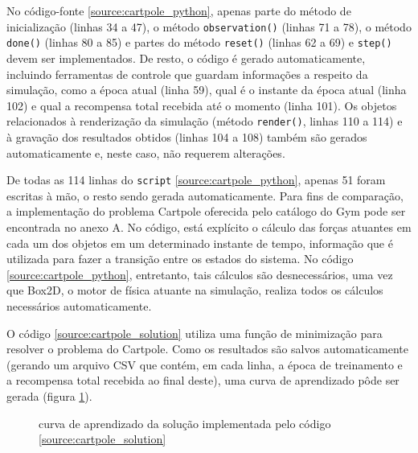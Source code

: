 \documentclass[cic,tc]{iiufrgs}
\begin{document}
No código-fonte \ref{source:cartpole_python}, apenas parte do método de inicialização (linhas 34 a 47),
o método \texttt{observation()} (linhas 71 a 78), o método \texttt{done()} (linhas 80 a 85)
e partes do método \texttt{reset()} (linhas 62 a 69) e \texttt{step()}
devem ser implementados. De resto, o código é gerado automaticamente,
incluindo ferramentas de controle que guardam informações a respeito da simulação,
como a época atual (linha 59), qual é o instante da época atual (linha 102) e
qual a recompensa total recebida até o momento (linha 101). Os objetos
relacionados à renderização da simulação (método \texttt{render()}, linhas 110 a
114) e à gravação dos resultados obtidos (linhas 104 a 108) também são gerados
automaticamente e, neste caso, não requerem alterações.


De todas as 114 linhas do \texttt{script} \ref{source:cartpole_python}, apenas
51 foram escritas à mão, o resto sendo gerada automaticamente. Para fins de
comparação, a implementação do problema Cartpole oferecida pelo catálogo do Gym
pode ser encontrada no anexo A. No código, está explícito o cálculo das forças
atuantes em cada um dos objetos em um determinado instante de tempo, informação
que é utilizada para fazer a transição entre os estados do sistema. No código
\ref{source:cartpole_python}, entretanto, tais cálculos são desnecessários, uma
vez que Box2D, o motor de física atuante na simulação, realiza todos os cálculos
necessários automaticamente.

O código \ref{source:cartpole_solution} utiliza uma função de minimização para
resolver o problema do Cartpole. Como os resultados são salvos automaticamente
(gerando um arquivo CSV que contém, em cada linha, a época de treinamento e a
recompensa total recebida ao final deste), uma curva de aprendizado pôde ser
gerada (figura \ref{fig:cartpole_curve}).

\begin{figure}[h]
  \begin{center}
  \caption{curva de aprendizado da solução implementada pelo código \ref{source:cartpole_solution}}
  \label{fig:cartpole_curve}
\end{center}
\end{figure}
\end{document}
